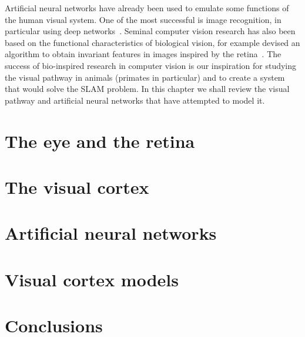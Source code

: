 
Artificial neural networks have already been used to emulate some functions of the human visual system. One of the most successful is image recognition, in particular using deep networks~\cite{deep-nets-hinton2006fast,krizhevsky2012imagenet}. Seminal computer vision research has also been based on the functional characteristics of biological vision, for example  \citeauthor{lowe1999object} devised an algorithm to obtain invariant features in images inspired by the retina~\cite{lowe1999object,lowe2004distinctive,alahi2012freak}. The success of bio-inspired research in computer vision is our inspiration for studying the visual pathway in animals (primates in particular) and to create a system that would solve the SLAM problem. In this chapter we shall review the visual pathway and artificial neural networks that have attempted to model it. 

\section{The eye and the retina}
\label{sec:vision:eye}


\section{The visual cortex}
\label{sec:vision:cortex}


\section{Artificial neural networks}


\section{Visual cortex models}


\section{Conclusions}
\label{sec:vision:conclusions}

